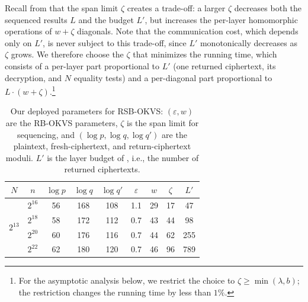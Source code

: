 Recall from  that the span limit $\zeta$ creates a trade-off: a larger $\zeta$ decreases both the sequenced results $L$ and the budget $L'$, but increases the per-layer homomorphic operations of $w+\zeta$ diagonals. Note that the communication cost, which depends only on $L'$, is never subject to this trade-off, since $L'$ monotonically decreases as $\zeta$ grows. We therefore choose the $\zeta$ that minimizes the running time, which consists of a per-layer part proportional to $L'$ (one returned ciphertext, its decryption, and $N$ equality tests) and a per-diagonal part proportional to $L\cdot(w+\zeta)$.\footnote{For the asymptotic analysis below, we restrict the choice to $\zeta \ge \min(\lambda, b)$; the restriction changes the running time by less than $1\%$.}

\begin{table}[h]
    \centering
    \caption{Our deployed parameters for RSB-OKVS: $(\varepsilon, w)$ are
    the RB-OKVS parameters, $\zeta$ is the span limit for sequencing, and
    $(\log p, \log q, \log q')$ are the plaintext, fresh-ciphertext, and
    return-ciphertext moduli. $L'$ is the layer budget of
    , i.e., the number of returned ciphertexts.}
    \label{tab:rsb_params}
    \setlength{\tabcolsep}{4pt}

    \small{
    \begin{tabular}{c|c|ccc|ccc|c}
        \toprule
        $N$ & $n$ & $\log p$ & $\log q$ & $\log q'$ & $\varepsilon$ & $w$ & $\zeta$ & $L'$ \\
        \midrule
        \multirow{4}{*}{$2^{13}$}
        & $2^{16}$ & 56 & 168 & 108 & 1.1 & 29 & 17 & 47  \\
        & $2^{18}$ & 58 & 172 & 112 & 0.7 & 43 & 44 & 98  \\
        & $2^{20}$ & 60 & 176 & 116 & 0.7 & 44 & 62 & 255 \\
        & $2^{22}$ & 62 & 180 & 120 & 0.7 & 46 & 96 & 789 \\
        \bottomrule
    \end{tabular}%
    }
\end{table}


